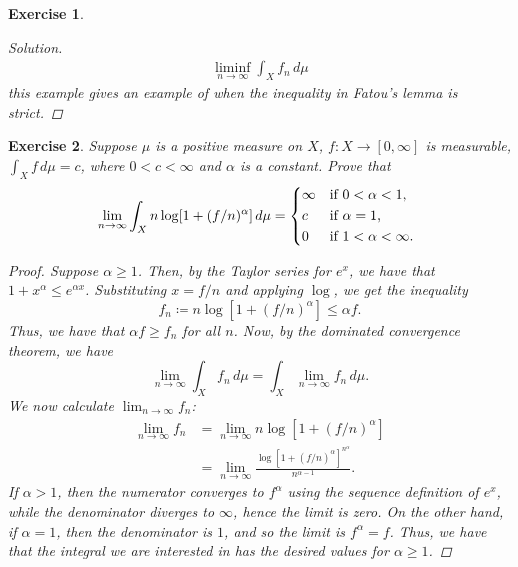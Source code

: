 \documentclass[10pt,letterpaper]{amsart}
\newtheorem{exercise}{Exercise}[section]
\theoremstyle{definition}
\theoremstyle{remark}
\numberwithin{equation}{exercise}
\begin{document}
\begin{multicols}{2}
\begin{exercise}
\begin{proof}[Solution]
\begin{multline*}
        \liminf_{n \to \infty}
        \int_X f_n\,d\mu
      \end{multline*}
      this example gives an example of when the inequality in Fatou's lemma is
      strict.
    \end{proof}
  \end{exercise}
  \begin{exercise}
    Suppose $\mu$ is a positive measure on $X$, $f \colon X \to [0,\infty]$ is
    measurable, $\int_X f\,d\mu = c$, where $0 <c < \infty$ and $\alpha$ is a
    constant. Prove that
    \begin{equation*}
      \lim_{n \to \infty} \int_X n\log[1+(f/n)^\alpha]\,d\mu = \begin{dcases*}
        \infty & if $0 < \alpha < 1$,\\
        c & if $\alpha = 1$,\\
        0 & if $1 < \alpha < \infty$.
      \end{dcases*}
    \end{equation*}
    \begin{proof}
      Suppose $\alpha \ge 1$. Then, by the Taylor series for $e^x$, we have that
      $1 + x^\alpha \le e^{\alpha x}$. Substituting $x = f/n$ and applying
      $\log$, we get the inequality
      \begin{equation*}
        f_n \coloneqq n\log[1+(f/n)^\alpha] \le \alpha f.
      \end{equation*}
      Thus, we have that $\alpha f \ge f_n$ for all $n$. Now, by the dominated
      convergence theorem, we have
      \begin{equation*}
        \lim_{n \to \infty} \int_X f_n\,d\mu = \int_X \lim_{n \to \infty}
        f_n\,d\mu.
      \end{equation*}
      We now calculate $\lim_{n \to \infty} f_n$:
      \begin{align*}
        \lim_{n \to \infty} f_n &= \lim_{n \to \infty} n\log[1+(f/n)^\alpha]\\
        &= \lim_{n \to \infty}
        \frac{\log[1+(f/n)^\alpha]^{n^\alpha}}{n^{\alpha-1}}.
      \end{align*}
      If $\alpha > 1$, then the numerator converges to $f^\alpha$ using the
      sequence definition of $e^x$, while the
      denominator diverges to $\infty$, hence the limit is zero. On the other
      hand, if $\alpha = 1$, then the denominator is $1$, and so the limit is
      $f^\alpha = f$. Thus, we have that the integral we are interested in has
      the desired values for $\alpha \ge 1$.

\end{proof}
\end{exercise}
\end{multicols}
\end{document}

